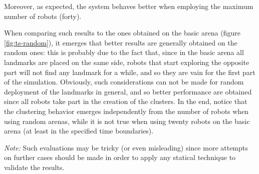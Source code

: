 \noindent
Moreover, as expected, the system behaves better when employing the maximum number of robots (forty). 

\bigskip
When comparing such results to the ones obtained on the basic arena (figure \ref{fig:ts-random}), it emerges that better results are generally obtained on the random ones: this is probably due to the fact that, since in the basic arena all landmarks are placed on the same side, robots that start exploring the opposite part will not find any landmark for a while, and so they are vain for the first part of the simulation. Obviously, such considerations can not be made for random deployment of the landmarks in general, and so better performance are obtained since all robots take part in the creation of the clusters. In the end, notice that the clustering behavior emerges independently from the number of robots when using random arenas, while it is not true when using twenty robots on the basic arena (at least in the specified time boundaries).

\bigskip
\noindent
\textit{Note:} Such evaluations may be tricky (or even misleading) since more attempts on further cases should be made in order to apply any statical technique to validate the results.


